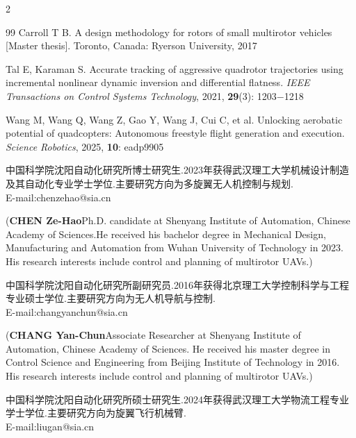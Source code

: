 \documentclass{aas}
\begin{document}
\begin{multicols}{2}
\begin{thebibliography}{99}
 Carroll T B. A design methodology for rotors of small multirotor vehicles [Master thesis]. Toronto, Canada: Ryerson University, 2017

 Tal E, Karaman S. Accurate tracking of aggressive quadrotor trajectories using incremental nonlinear dynamic inversion and differential flatness. {\sl IEEE Transactions on Control Systems Technology}, 2021, {\bf 29}(3): 1203$-$1218

 Wang M, Wang Q, Wang Z, Gao Y, Wang J, Cui C, et al. Unlocking aerobatic potential of quadcopters: Autonomous freestyle flight generation and execution. {\sl Science Robotics}, 2025, {\bf 10}: eadp9905

\end{thebibliography}

\begin{biographynophoto}
\quad 中国科学院沈阳自动化研究所博士研究生.2023年获得武汉理工大学机械设计制造及其自动化专业学士学位.主要研究方向为多旋翼无人机控制与规划.\\E-mail:chenzehao@sia.cn

\noindent({\bf CHEN Ze-Hao}\quad Ph.D. candidate at Shenyang Institute of Automation, Chinese Academy of Sciences.He received his bachelor degree in Mechanical Design, Manufacturing and Automation from Wuhan University of Technology in 2023. His research interests include control and planning of multirotor UAVs.)
\end{biographynophoto}

\begin{biographynophoto}
\quad 中国科学院沈阳自动化研究所副研究员.2016年获得北京理工大学控制科学与工程专业硕士学位.主要研究方向为无人机导航与控制.\\E-mail:changyanchun@sia.cn

\noindent({\bf CHANG Yan-Chun}\quad Associate Researcher at Shenyang Institute of Automation, Chinese Academy of Sciences. He received his master degree in Control Science and Engineering from Beijing Institute of Technology in 2016. His research interests include control and planning of multirotor UAVs.)
\end{biographynophoto}

\begin{biographynophoto}
\quad 中国科学院沈阳自动化研究所硕士研究生.2024年获得武汉理工大学物流工程专业学士学位.主要研究方向为旋翼飞行机械臂.\\E-mail:liugan@sia.cn


\end{biographynophoto}
\end{multicols}
\end{document}
